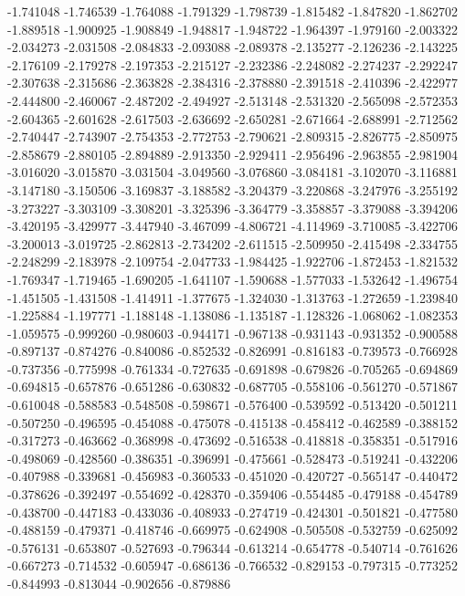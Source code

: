 -1.741048
-1.746539
-1.764088
-1.791329
-1.798739
-1.815482
-1.847820
-1.862702
-1.889518
-1.900925
-1.908849
-1.948817
-1.948722
-1.964397
-1.979160
-2.003322
-2.034273
-2.031508
-2.084833
-2.093088
-2.089378
-2.135277
-2.126236
-2.143225
-2.176109
-2.179278
-2.197353
-2.215127
-2.232386
-2.248082
-2.274237
-2.292247
-2.307638
-2.315686
-2.363828
-2.384316
-2.378880
-2.391518
-2.410396
-2.422977
-2.444800
-2.460067
-2.487202
-2.494927
-2.513148
-2.531320
-2.565098
-2.572353
-2.604365
-2.601628
-2.617503
-2.636692
-2.650281
-2.671664
-2.688991
-2.712562
-2.740447
-2.743907
-2.754353
-2.772753
-2.790621
-2.809315
-2.826775
-2.850975
-2.858679
-2.880105
-2.894889
-2.913350
-2.929411
-2.956496
-2.963855
-2.981904
-3.016020
-3.015870
-3.031504
-3.049560
-3.076860
-3.084181
-3.102070
-3.116881
-3.147180
-3.150506
-3.169837
-3.188582
-3.204379
-3.220868
-3.247976
-3.255192
-3.273227
-3.303109
-3.308201
-3.325396
-3.364779
-3.358857
-3.379088
-3.394206
-3.420195
-3.429977
-3.447940
-3.467099
-4.806721
-4.114969
-3.710085
-3.422706
-3.200013
-3.019725
-2.862813
-2.734202
-2.611515
-2.509950
-2.415498
-2.334755
-2.248299
-2.183978
-2.109754
-2.047733
-1.984425
-1.922706
-1.872453
-1.821532
-1.769347
-1.719465
-1.690205
-1.641107
-1.590688
-1.577033
-1.532642
-1.496754
-1.451505
-1.431508
-1.414911
-1.377675
-1.324030
-1.313763
-1.272659
-1.239840
-1.225884
-1.197771
-1.188148
-1.138086
-1.135187
-1.128326
-1.068062
-1.082353
-1.059575
-0.999260
-0.980603
-0.944171
-0.967138
-0.931143
-0.931352
-0.900588
-0.897137
-0.874276
-0.840086
-0.852532
-0.826991
-0.816183
-0.739573
-0.766928
-0.737356
-0.775998
-0.761334
-0.727635
-0.691898
-0.679826
-0.705265
-0.694869
-0.694815
-0.657876
-0.651286
-0.630832
-0.687705
-0.558106
-0.561270
-0.571867
-0.610048
-0.588583
-0.548508
-0.598671
-0.576400
-0.539592
-0.513420
-0.501211
-0.507250
-0.496595
-0.454088
-0.475078
-0.415138
-0.458412
-0.462589
-0.388152
-0.317273
-0.463662
-0.368998
-0.473692
-0.516538
-0.418818
-0.358351
-0.517916
-0.498069
-0.428560
-0.386351
-0.396991
-0.475661
-0.528473
-0.519241
-0.432206
-0.407988
-0.339681
-0.456983
-0.360533
-0.451020
-0.420727
-0.565147
-0.440472
-0.378626
-0.392497
-0.554692
-0.428370
-0.359406
-0.554485
-0.479188
-0.454789
-0.438700
-0.447183
-0.433036
-0.408933
-0.274719
-0.424301
-0.501821
-0.477580
-0.488159
-0.479371
-0.418746
-0.669975
-0.624908
-0.505508
-0.532759
-0.625092
-0.576131
-0.653807
-0.527693
-0.796344
-0.613214
-0.654778
-0.540714
-0.761626
-0.667273
-0.714532
-0.605947
-0.686136
-0.766532
-0.829153
-0.797315
-0.773252
-0.844993
-0.813044
-0.902656
-0.879886
